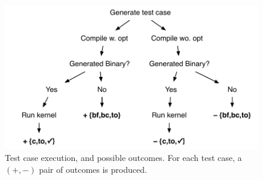 \begin{figure}
  \centering %
  \includegraphics[width=\columnwidth]{img/test_process}%
  \caption{%
  	Test case execution, and possible outcomes. For each test case, a $(+,-)$ pair of outcomes is produced.%
  }%
  \label{fig:test-process} %
\end{figure}

